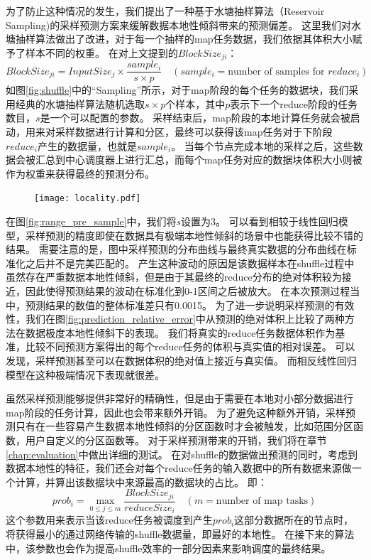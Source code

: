 为了防止这种情况的发生，我们提出了一种基于水塘抽样算法（Reservoir Sampling)\cite{reservoir}的采样预测方案来缓解数据本地性倾斜带来的预测偏差。
这里我们对水塘抽样算法做出了改进，对于每一个抽样的map任务数据，我们依据其体积大小赋予了样本不同的权重。
在对上文提到的$BlockSize_{ji}$：
\begin{equation}
	\label{eq:sample}
	BlockSize_{ji} = {{InputSize_j \times \frac{sample_i}{s \times p}}} \quad (sample_i =  \text{number of samples for }reduce_i)
\end{equation}
如图\ref{fig:shuffle}中的“Sampling”所示，对于map阶段的每个任务的数据块，我们采用经典的水塘抽样算法随机选取$s \times p$个样本，其中$p$表示下一个reduce阶段的任务数目，$s$是一个可以配置的参数。
采样结束后，map阶段的本地计算任务就会被启动，用来对采样数据进行计算和分区，最终可以获得该map任务对于下阶段$reduce_i$产生的数据量，也就是$sample_i$。
当每个节点完成本地的采样之后，这些数据会被汇总到中心调度器上进行汇总，而每个map任务对应的数据块体积大小则被作为权重来获得最终的预测分布。

\begin{figure}[!htp]
    \centering
    \texttt{[image: locality.pdf]}
\end{figure}

在图\ref{fig:range_pre_sample}中，我们将$s$设置为3。
可以看到相较于线性回归模型，采样预测的精度即使在数据具有极端本地性倾斜的场景中也能获得比较不错的结果。
需要注意的是，图中采样预测的分布曲线与最终真实数据的分布曲线在标准化之后并不是完美匹配的。
产生这种波动的原因是该数据样本在shuffle过程中虽然存在严重数据本地性倾斜，但是由于其最终的reduce分布的绝对体积较为接近，因此使得预测结果的波动在标准化到0-1区间之后被放大。
在本次预测过程当中，预测结果的数值的整体标准差只有0.0015。
为了进一步说明采样预测的有效性，我们在图\ref{fig:prediction_relative_error}中从预测的绝对体积上比较了两种方法在数据极度本地性倾斜下的表现。
我们将真实的reduce任务数据体积作为基准，比较不同预测方案得出的每个reduce任务的体积与真实值的相对误差。
可以发现，采样预测甚至可以在数据体积的绝对值上接近与真实值。
而相反线性回归模型在这种极端情况下表现就很差。

虽然采样预测能够提供非常好的精确性，但是由于需要在本地对小部分数据进行map阶段的任务计算，因此也会带来额外开销。
为了避免这种额外开销，采样预测只有在一些容易产生数据本地性倾斜的分区函数时才会被触发，比如范围分区函数，用户自定义的分区函数等。
对于采样预测带来的开销，我们将在章节\ref{chap:evaluation}中做出详细的测试。
在对shuffle的数据做出预测的同时，考虑到数据本地性的特征，我们还会对每个reduce任务的输入数据中的所有数据来源做一个计算，并算出该数据块中来源最高的数据块的占比。
即：
\begin{equation}
	\label{eq:prob}
	prob_i = \max_{0 \leq j \leq m} \frac{BlockSize_{ji}}{reduceSize_i} \quad (m = \text{number of map tasks})
\end{equation}
这个参数用来表示当该reduce任务被调度到产生$prob_i$这部分数据所在的节点时，将获得最小的通过网络传输的shuffle数据量，即最好的本地性。
在接下来的算法中，该参数也会作为提高shuffle效率的一部分因素来影响调度的最终结果。

